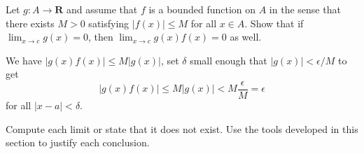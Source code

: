 \begin{exercise}
  Let $g: A \rightarrow \mathbf{R}$ and assume that $f$ is a bounded function on $A$ in the sense that there exists $M>0$ satisfying $|f(x)| \leq M$ for all $x \in A$.
Show that if $\lim _{x \rightarrow c} g(x)=0$, then $\lim _{x \rightarrow c} g(x) f(x)=0$ as well.
\end{exercise}

\begin{solution}
  We have $|g(x)f(x)| \le M|g(x)|$, set $\delta$ small enough that $|g(x)| < \epsilon/M$ to get
  $$|g(x)f(x)| \le M|g(x)| < M\frac{\epsilon}{M} = \epsilon$$
  for all $|x - a| < \delta$.
\end{solution}

\begin{exercise}
  Compute each limit or state that it does not exist. Use the tools developed in this section to justify each conclusion.
\end{exercise}

\begin{solution}
\end{solution}

